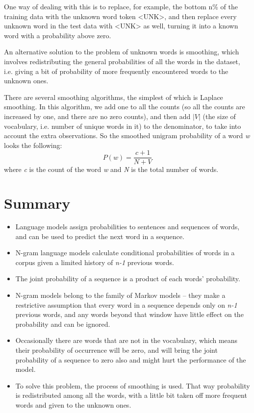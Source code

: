 One way of dealing with this is to replace, for example, the bottom n\% of the training data with the unknown word token <UNK>, and then replace every unknown word in the test data with <UNK> as well, turning it into a known word with a probability above zero.

An alternative solution to the problem of unknown words is smoothing, which involves redistributing the general probabilities of all the words in the dataset, i.e. giving a bit of probability of more frequently encountered words to the unknown ones.

There are several smoothing algorithms, the simplest of which is Laplace smoothing. In this algorithm, we add one to all the counts (so all the counts are increased by one, and there are no zero counts), and then add $|V|$ (the size of vocabulary, i.e. number of unique words in it) to the denominator, to take into account the extra observations. So the smoothed unigram probability of a word \textit{w} looks the following:
\begin{equation}
    P(w)=\frac{c+1}{N+V}
\end{equation}
where \textit{c} is the count of the word \textit{w} and \textit{N} is the total number of words.

\section{Summary}
\label{sec:NgramBackground-Summary}
\begin{itemize}
    \item Language models assign probabilities to sentences and sequences of words, and can be used to predict the next word in a sequence.
    \item N-gram language models calculate conditional probabilities of words in a corpus given a limited history of \textit{n-1} previous words.
    \item The joint probability of a sequence is a product of each words' probability.
    \item N-gram models belong to the family of Markov models -- they make a restrictive assumption that every word in a sequence depends only on \textit{n-1} previous words, and any words beyond that window have little effect on the probability and can be ignored.
    \item Occasionally there are words that are not in the vocabulary, which means their probability of occurrence will be zero, and will bring the joint probability of a sequence to zero also and might hurt the performance of the model.
    \item To solve this problem, the process of smoothing is used. That way probability is redistributed among all the words, with a little bit taken off more frequent words and given to the unknown ones.
\end{itemize}